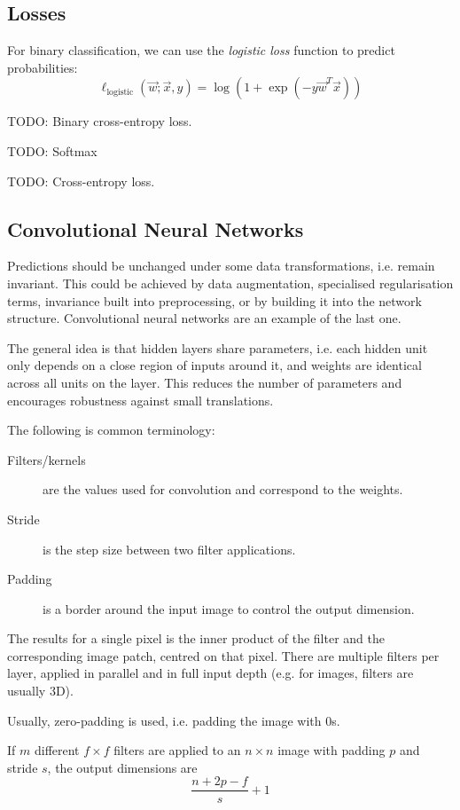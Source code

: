 \subsection{Losses}
For binary classification, we can use the
\emph{logistic loss} function to predict
probabilities:
\begin{equation*}
\ell_\text{logistic}(\vec{w}; \vec{x}, y) =
\log{(1 + \exp{(- y \vec{w}^T \vec{x})})}
\end{equation*}

TODO: Binary cross-entropy loss.

TODO: Softmax

TODO: Cross-entropy loss.


\subsection{Convolutional Neural Networks}
Predictions should be unchanged under some data transformations,
i.e. remain invariant.
This could be achieved by data augmentation,
specialised regularisation terms,
invariance built into preprocessing,
or by building it into the network structure.
Convolutional neural networks are an example of the last one.

The general idea is that hidden layers share parameters,
i.e. each hidden unit only depends on a close region of inputs
around it,
and weights are identical across all units on the layer.
This reduces the number of parameters
and encourages robustness against small translations.

The following is common terminology:
\begin{description}
	\item[Filters/kernels] are the values used for convolution
	and correspond to the weights.
	\item[Stride] is the step size between
	two filter applications.
	\item[Padding] is a border around the input image to control the output dimension.
\end{description}

The results for a single pixel is the inner product
of the filter and the corresponding
image patch, centred on that pixel.
There are multiple filters per layer, applied in parallel
and in full input depth
(e.g. for images, filters are usually 3D).

Usually, zero-padding is used, i.e. padding the image with $0$s.

If $m$ different $f \times f$ filters are applied
to an $n \times n$ image
with padding $p$ and stride $s$,
the output dimensions are
\begin{equation*}
\frac{n + 2p - f}{s} + 1
\end{equation*}


